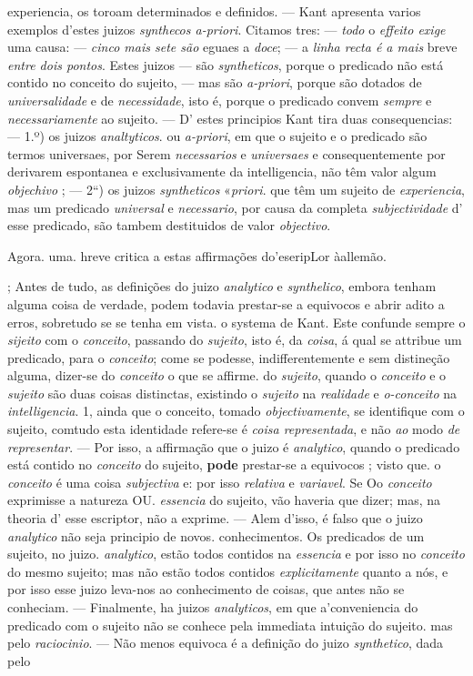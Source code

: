 experiencia, os toroam determinados e definidos. --- Kant apresenta varios exemplos d'estes juizos \emph{synthecos a-priori}. Citamos tres: --- \emph{todo} o \emph{effeito exige} uma causa: --- \emph{cinco mais sete são} eguaes a \emph{doce}; --- a \emph{linha recta é a mais} breve \emph{entre dois pontos}. Estes juizos --- são \emph{syntheticos}, porque o predicado não está contido no conceito do sujeito, --- mas são \emph{a-priori}, porque são dotados de \emph{universalidade} e de \emph{necessidade}, isto é, porque o predicado convem \emph{sempre} e \emph{necessariamente} ao sujeito. --- D' estes principios Kant tira duas consequencias: --- 1.º) os juizos \emph{analtyticos}. ou \emph{a-priori}, em que o sujeito e o predicado são termos universaes, por Serem \emph{necessarios} e \emph{universaes} e consequentemente por derivarem espontanea e exclusivamente da intelligencia, não têm valor algum \emph{objechivo} ; --- 2“) os juizos \emph{syntheticos} «\emph{priori}. que têm um sujeito de \emph{experiencia}, mas um predicado \emph{universal} e \emph{necessario}, por causa da completa \emph{subjectividade} d' esse predicado, são tambem destituidos de valor \emph{objectivo}.\par Agora. uma. hreve critica a estas affirmações do'eseripLor àallemão.\par ; Antes de tudo, as definições do juizo \emph{analytico} e \emph{synthelico}, embora tenham alguma coisa de verdade, podem todavia prestar-se a equivocos e abrir adito a erros, sobretudo se se tenha em vista. o systema de Kant. Este confunde sempre o \emph{sijeito} com o \emph{conceito}, passando do \emph{sujeito}, isto é, da \emph{coisa}, á qual se attribue um predicado, para o \emph{conceito}; come se podesse, indifferentemente e sem distineção alguma, dizer-se do \emph{conceito} o que se affirme. do \emph{sujeito}, quando o \emph{conceito} e o \emph{sujeito} são duas coisas distinctas, existindo o \emph{sujeito} na \emph{realidade} e \emph{o-conceito} na \emph{intelligencia}. 1, ainda que o conceito, tomado \emph{objectivamente}, se identifique com o sujeito, comtudo esta identidade refere-se é \emph{coisa representada}, e não \emph{ao} modo \emph{de representar}. --- Por isso, a affirmação que o juizo é \emph{analytico}, quando o predicado está contido no \emph{conceito} do sujeito, \textbf{pode} prestar-se a equivocos ; visto que. o \emph{conceito} é uma coisa \emph{subjectiva} e: por isso \emph{relativa} e \emph{variavel}. Se Oo \emph{conceito} exprimisse a natureza OU. \emph{essencia} do sujeito, vão haveria que dizer; mas, na theoria d' esse escriptor, não a exprime. --- Alem d'isso, é falso que o juizo \emph{analytico} não seja principio de novos. conhecimentos. Os predicados de um sujeito, no juizo. \emph{analytico}, estão todos contidos na \emph{essencia} e por isso no \emph{conceito} do mesmo sujeito; mas não estão todos contidos \emph{explicitamente} quanto a nós, e por isso esse juizo leva-nos ao conhecimento de coisas, que antes não se conheciam. --- Finalmente, ha juizos \emph{analyticos}, em que a'conveniencia do predicado com o sujeito não se conhece pela immediata intuição do sujeito. mas pelo \emph{raciocinio}. --- Não menos equivoca é a definição do juizo \emph{synthetico}, dada pelo 